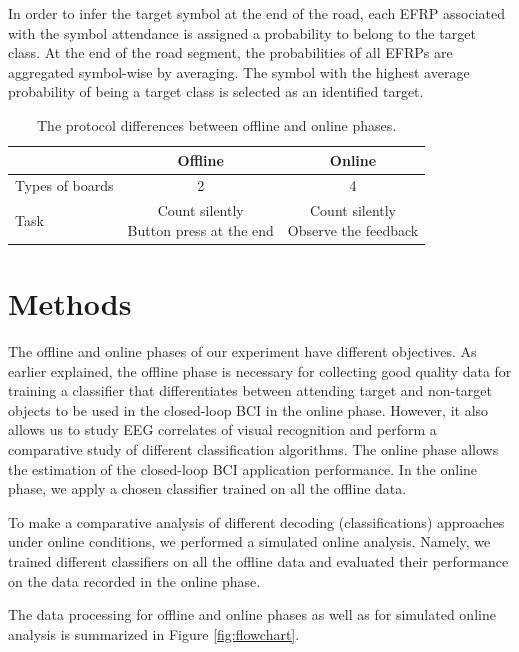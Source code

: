 \documentclass[12pt]{iopart}
\begin{document}
In order to infer the target symbol at the end of the road, each EFRP associated with the
symbol attendance is assigned a probability to belong to the target class. 
At the end of the road segment, the probabilities
of all EFRPs are aggregated symbol-wise by averaging.
The symbol with the highest average probability of being a target class
is selected as an identified target.

\begin{table}
    \centering
    \caption{The protocol differences between offline and online phases.}
    \begin{tabular}{l | c | c}
        \hline 
        & Offline & Online \\
        \hline 
        Types of boards & 2 & 4 \\
        \hline
        Task & \shortstack{Count silently \\ Button press at the end} & \shortstack{Count silently \\ Observe the feedback} \\
        \hline 
    \end{tabular}
    \label{tab:OffOn}
\end{table}



\section{Methods}
\label{sec:methods}
The offline and online phases of our experiment have different objectives. As earlier explained, the offline phase is necessary for collecting good quality data for training a classifier that differentiates between attending target and non-target objects to be used in the closed-loop BCI in the online phase. However, it also allows us to study EEG correlates of visual recognition and perform a comparative study of different classification algorithms. The online phase allows the estimation of the closed-loop BCI application performance. In the online phase, we apply a chosen classifier trained on all the offline data. 

To make a comparative analysis of different decoding (classifications) approaches under online conditions, we performed a simulated online analysis. Namely, we trained different classifiers on all the offline data and evaluated their performance on the data recorded in the online phase. 

The data processing for offline and online phases as well as for simulated online analysis is 
summarized in Figure \ref{fig:flowchart}.
\end{document}
